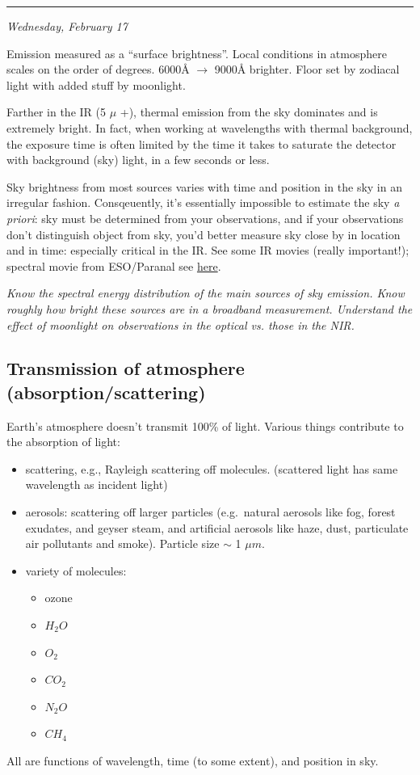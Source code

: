 \documentclass[12pt]{article}
\newcommand{\mynotes}[1]{\textcolor{myBlue}{#1}}
\newcommand{\test}[1]{%
    \begin{center}
        {\parbox{0.9\textwidth}{\textit{\small#1}}}
    \end{center}}
\newcommand{\mydate}[1]{
    \begin{flushright}
        \rule{\textwidth}{0.4pt} %
        \small\hfill\textit{#1}
    \end{flushright}}
\begin{document}
\mydate{Wednesday, February 17}
\mynotes{Emission measured as a ``surface brightness''.
Local conditions in atmosphere scales on the order of degrees.
6000\AA{} $\rightarrow$ 9000\AA{} brighter. Floor set by zodiacal
light with added stuff by moonlight.}

Farther in the IR (5 $\mu$ +), thermal emission from the sky dominates
and is extremely bright. In fact, when working at wavelengths with thermal
background, the exposure time is often limited by the time it takes to
saturate the detector with background (sky) light, in a few seconds or less.

Sky brightness from most sources varies with time and position in the sky in an
irregular fashion. Consqeuently, it's essentially impossible to estimate the
sky \emph{a priori}: sky must be determined from your observations, and if your
observations don't distinguish object from sky, you'd better measure sky close
by in location and in time: especially critical in the IR\@. See some %
{IR movies} (really important!); %
{spectral movie from ESO/Paranal} see \href{https://www.astro.uni-bonn.de/theli/gui/aboutbackground.html}
{here}.

\test{Know the spectral energy distribution of the main sources of sky emission.
Know roughly how bright these sources are in a broadband measurement.
Understand the effect of moonlight on observations in the optical vs. those in
the NIR.}

\subsection{Transmission of atmosphere (absorption/scattering)}
Earth's atmosphere doesn't transmit 100\% of light. Various things
contribute to the absorption of light:
\begin{itemize}
    \item scattering, e.g., Rayleigh scattering off molecules.
        \mynotes{(scattered light has same wavelength as incident light)}
    \item aerosols: scattering off larger particles (e.g.\ natural
    aerosols like fog, forest exudates, and geyser steam, and
    artificial aerosols like haze, dust, particulate air pollutants
    and smoke). Particle size $\sim$ 1 $\mu m$.
    \item variety of molecules:
    \begin{itemize}
        \item ozone
        \item $H_{2}O$
        \item $O_{2}$
        \item $CO_{2}$
        \item $N_{2}O$
        \item $CH_{4}$
    \end{itemize}
\end{itemize}
All are functions of wavelength, time (to some extent), and position in sky.
\end{document}
